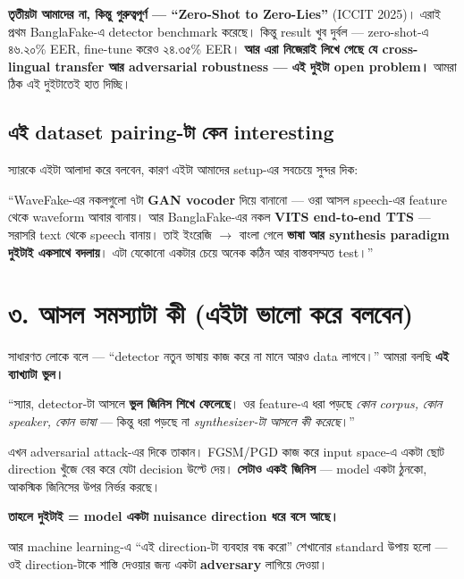 \documentclass[11pt,a4paper]{article}
\newenvironment{say}{%
  \def\FrameCommand{\textcolor{barcol}{\vrule width 3pt}\hspace{8pt}}%
  \MakeFramed{\advance\hsize-\width \FrameRestore}%
}{\endMakeFramed}
\begin{document}
\textbf{তৃতীয়টা আমাদের না, কিন্তু গুরুত্বপূর্ণ --- ``Zero-Shot to Zero-Lies''}
(ICCIT 2025)। এরাই প্রথম BanglaFake-এ detector benchmark করেছে। কিন্তু result
খুব দুর্বল --- zero-shot-এ ৪৬.২০\% EER, fine-tune করেও ২৪.৩৫\% EER।
\textbf{আর এরা নিজেরাই লিখে গেছে যে cross-lingual transfer আর adversarial
robustness --- এই দুইটা open problem।} আমরা ঠিক এই দুইটাতেই হাত দিচ্ছি।

\subsection*{এই dataset pairing-টা কেন interesting}

স্যারকে এইটা আলাদা করে বলবেন, কারণ এইটা আমাদের setup-এর সবচেয়ে সুন্দর দিক:

\begin{say}
``WaveFake-এর নকলগুলো ৭টা \textbf{GAN vocoder} দিয়ে বানানো --- ওরা আসল speech-এর
feature থেকে waveform আবার বানায়। আর BanglaFake-এর নকল \textbf{VITS end-to-end
TTS} --- সরাসরি text থেকে speech বানায়। তাই ইংরেজি $\rightarrow$ বাংলা গেলে
\textbf{ভাষা আর synthesis paradigm দুইটাই একসাথে বদলায়}। এটা যেকোনো একটার চেয়ে
অনেক কঠিন আর বাস্তবসম্মত test।''
\end{say}

\section*{৩. আসল সমস্যাটা কী (এইটা ভালো করে বলবেন)}

সাধারণত লোকে বলে --- ``detector নতুন ভাষায় কাজ করে না মানে আরও data লাগবে।''
আমরা বলছি \textbf{এই ব্যাখ্যাটা ভুল।}

\begin{say}
``স্যার, detector-টা আসলে \textbf{ভুল জিনিস শিখে ফেলেছে}। ওর feature-এ ধরা পড়ছে
\emph{কোন corpus, কোন speaker, কোন ভাষা} --- কিন্তু ধরা পড়ছে না
\emph{synthesizer-টা আসলে কী করেছে}।''
\end{say}

এখন adversarial attack-এর দিকে তাকান। FGSM/PGD কাজ করে input space-এ একটা ছোট
direction খুঁজে বের করে যেটা decision উল্টে দেয়। \textbf{সেটাও একই জিনিস} ---
model একটা ঠুনকো, আকস্মিক জিনিসের উপর নির্ভর করছে।

\textbf{তাহলে দুইটাই = model একটা nuisance direction ধরে বসে আছে।}

আর machine learning-এ ``এই direction-টা ব্যবহার বন্ধ করো'' শেখানোর standard উপায়
হলো --- ওই direction-টাকে শাস্তি দেওয়ার জন্য একটা \textbf{adversary} লাগিয়ে দেওয়া।
\end{document}
